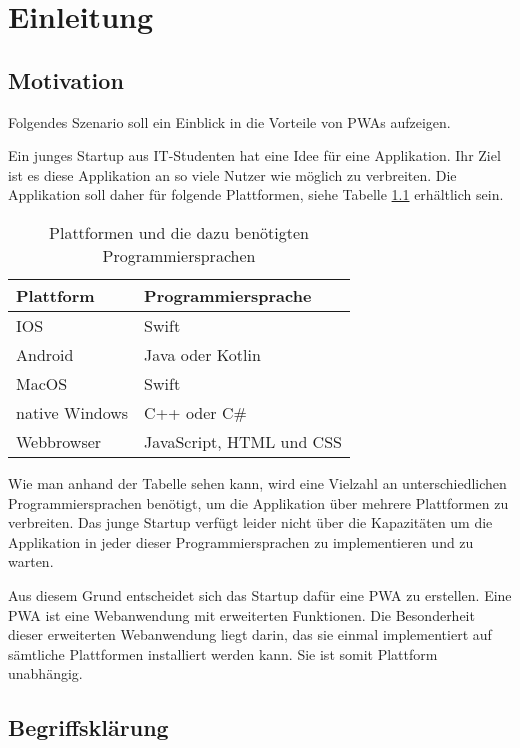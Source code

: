 
\chapter{Einleitung} \label{ch:Einleitung}
\section{Motivation} \label{se:Motivation}

Folgendes Szenario soll ein Einblick in die Vorteile von \ac{PWAs} aufzeigen. 

Ein junges Startup aus IT-Studenten hat eine Idee für eine Applikation. Ihr Ziel ist es diese Applikation an so viele Nutzer wie möglich zu verbreiten. Die Applikation soll daher für folgende Plattformen, siehe Tabelle \ref{plattformen} erhältlich sein.

\begin{table}[!htb]\label{plattformen}
\begin{tabularx}{\textwidth}{|X|X|}
    \hline
    \textbf{Plattform} & \textbf{Programmiersprache} \\
    \hline
    \hline
    IOS & Swift \\
    \hline
    Android & Java oder Kotlin\\
    \hline
    MacOS & Swift \\
    \hline 
    native Windows & C++ oder C\# \\
    \hline
    Webbrowser & JavaScript, HTML und CSS \\
    \hline
\end{tabularx}
\caption{Plattformen und die dazu benötigten Programmiersprachen}
\end{table}

Wie man anhand der Tabelle sehen kann, wird eine Vielzahl an unterschiedlichen Programmiersprachen benötigt, um die Applikation über mehrere Plattformen zu verbreiten. Das junge Startup verfügt leider nicht über die Kapazitäten um die Applikation in jeder dieser Programmiersprachen zu implementieren und zu warten. 

Aus diesem Grund entscheidet sich das Startup dafür eine \ac{PWA} zu erstellen. Eine PWA ist eine Webanwendung mit erweiterten Funktionen. Die Besonderheit dieser erweiterten Webanwendung liegt darin, das sie einmal implementiert auf sämtliche Plattformen installiert werden kann. Sie ist somit Plattform unabhängig. 

\section{Begriffsklärung}\label{se:Begriffsklaerung}

